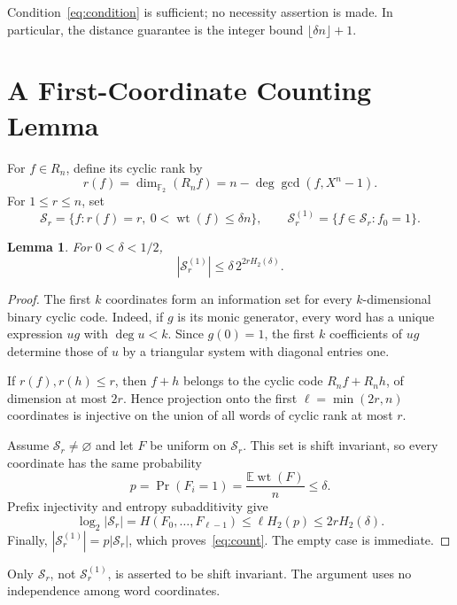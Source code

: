 \documentclass[12pt,letterpaper,onecolumn]{article}
\newtheorem{lemma}[theorem]{Lemma}
\theoremstyle{remark}
\newcommand{\F}{\mathbb F}
\newcommand{\E}{\mathbb E}
\newcommand{\wt}{\operatorname{wt}}
\newcommand{\rkcyc}{r}
\begin{document}
Condition~\eqref{eq:condition} is sufficient; no necessity assertion is made. In particular, the distance guarantee is the integer bound $\lfloor\delta n\rfloor+1$.

\section{A First-Coordinate Counting Lemma}
For $f\in R_n$, define its cyclic rank by
\begin{equation}
 \rkcyc(f)=\dim_{\F_2}(R_nf)
 =n-\deg\gcd(f,X^n-1).
 \label{eq:rank}
\end{equation}
For $1\le r\le n$, set
\[
 \mathcal S_r=\{f:\rkcyc(f)=r,\ 0<\wt(f)\le\delta n\},
 \qquad
 \mathcal S_r^{(1)}=\{f\in\mathcal S_r:f_0=1\}.
\]

\begin{lemma}\label{lem:count}
For $0<\delta<1/2$,
\begin{equation}
 |\mathcal S_r^{(1)}|\le\delta\,2^{2rH_2(\delta)}.
 \label{eq:count}
\end{equation}
\end{lemma}
\begin{proof}
The first $k$ coordinates form an information set for every $k$-dimensional binary cyclic code. Indeed, if $g$ is its monic generator, every word has a unique expression $ug$ with $\deg u<k$. Since $g(0)=1$, the first $k$ coefficients of $ug$ determine those of $u$ by a triangular system with diagonal entries one.

If $\rkcyc(f),\rkcyc(h)\le r$, then $f+h$ belongs to the cyclic code $R_nf+R_nh$, of dimension at most $2r$. Hence projection onto the first $\ell=\min(2r,n)$ coordinates is injective on the union of all words of cyclic rank at most $r$.

Assume $\mathcal S_r\ne\varnothing$ and let $F$ be uniform on $\mathcal S_r$. This set is shift invariant, so every coordinate has the same probability
\[
 p=\Pr(F_i=1)=\frac{\E\wt(F)}n\le\delta.
\]
Prefix injectivity and entropy subadditivity give
\[
 \log_2|\mathcal S_r|
 =H(F_0,\ldots,F_{\ell-1})
 \le\ell H_2(p)\le2rH_2(\delta).
\]
Finally, $|\mathcal S_r^{(1)}|=p|\mathcal S_r|$, which proves~\eqref{eq:count}. The empty case is immediate.
\end{proof}

Only $\mathcal S_r$, not $\mathcal S_r^{(1)}$, is asserted to be shift invariant. The argument uses no independence among word coordinates.
\end{document}
